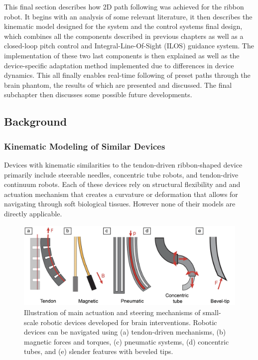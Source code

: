 This final section describes how 2D path following was achieved for the ribbon robot. It begins with an analysis of some relevant literature, it then describes the kinematic model designed for the system and the control systems final design, which combines all the components described in previous chapters as well as a closed-loop pitch control and Integral-Line-Of-Sight (ILOS) guidance system. The implementation of these two last components is then explained as well as the device-specific adaptation method implemented due to differences in device dynamics. This all finally enables real-time following of preset paths through the brain phantom, the results of which are presented and discussed. The final subchapter then discusses some possible future developments.

\subsection{Background}
\subsubsection{Kinematic Modeling of Similar Devices}
Devices with kinematic similarities to the tendon-driven ribbon-shaped device primarily include steerable needles, concentric tube robots, and tendon-drive continuum robots. Each of these devices rely on structural flexibility and and actuation mechanism that creates a curvature or deformation that allows for navigating through soft biological tissues. However none of their models are directly applicable.
\begin{figure} [H]
    \centering
    \includegraphics[width=0.9\linewidth]{images/steerableNeedles/actuations.png}
    \caption{Illustration of main actuation and steering mechanisms of small-scale robotic devices developed for brain interventions. Robotic devices can be navigated using (a) tendon-driven mechanisms, (b) magnetic forces and torques, (c) pneumatic systems,  (d) concentric tubes, and (e) slender features with beveled tips. \cite{noseda_small-scale_2024}}
    \label{fig:actuations}
\end{figure}

